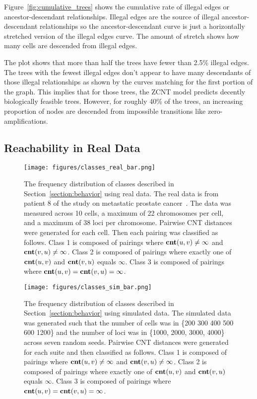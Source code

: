 Figure~\ref{fig:cumulative_trees} shows the cumulative rate of illegal edges or ancestor-descendant relationships. Illegal edges are the source of illegal ancestor-descendant relationships so the ancestor-descendant curve is just a horizontally stretched version of the illegal edges curve. The amount of stretch shows how many cells are descended from illegal edges. 

The plot shows that more than half the trees have fewer than 2.5\% illegal edges. The trees with the fewest illegal edges don't appear to have many descendants of those illegal relationships as shown by the curves matching for the first portion of the graph. This implies that for those trees, the ZCNT model predicts decently biologically feasible trees. However, for roughly 40\% of the trees, an increasing proportion of nodes are descended from impossible transitions like zero-amplifications. 

\subsection{Reachability in Real Data}\label{section:real_reachability_res}

\begin{figure}[ht]
    \centering 
    \texttt{[image: figures/classes\_real\_bar.png]}
    \caption{The frequency distribution of classes described in Section~\ref{section:behavior} using real data. The real data is from patient 8 of the study on metastatic prostate cancer~\cite{real_data}. The data was measured across 10 cells, a maximum of 22 chromosomes per cell, and a maximum of 38 loci per chromosome. Pairwise CNT distances were generated for each cell. Then each pairing was classified as follows. Class 1 is composed of pairings where $\textbf{cnt}(u, v) \neq \infty$ and $\textbf{cnt}(v, u) \neq \infty$. Class 2 is composed of pairings where exactly one of $\textbf{cnt}(u, v)$ and $\textbf{cnt}(v, u)$ equals $\infty$. Class 3 is composed of pairings where $\textbf{cnt}(u, v) = \textbf{cnt}(v, u) = \infty$.}\label{fig:classes_real_bar}
\end{figure}

\begin{figure}[ht]
    \centering 
    \texttt{[image: figures/classes\_sim\_bar.png]}
    \caption{The frequency distribution of classes described in Section~\ref{section:behavior} using simulated data. The simulated data was generated such that the number of cells was in \{200 300 400 500 600 1200\} and the number of loci was in \{1000, 2000, 3000, 4000\} across seven random seeds. Pairwise CNT distances were generated for each suite and then classified as follows. Class 1 is composed of pairings where $\textbf{cnt}(u, v) \neq \infty$ and $\textbf{cnt}(v, u) \neq \infty$. Class 2 is composed of pairings where exactly one of $\textbf{cnt}(u, v)$ and $\textbf{cnt}(v, u)$ equals $\infty$. Class 3 is composed of pairings where $\textbf{cnt}(u, v) = \textbf{cnt}(v, u) = \infty$.}\label{fig:classes_sim_bar}
\end{figure}

